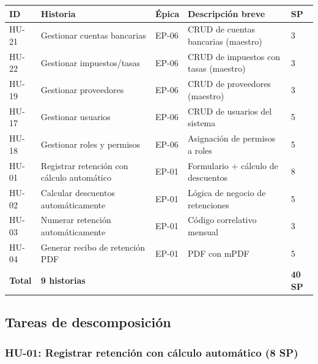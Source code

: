 \documentclass[stu]{apa7}
\begin{document}
\begin{longtable}{|C{1cm}|L{4cm}|L{2cm}|L{3cm}|L{2cm}|}
\hline
{}
\textbf{ID} & \textbf{Historia} & \textbf{Épica} & \textbf{Descripción breve} & \textbf{SP} \\
\hline
\endhead
HU-21 & Gestionar cuentas bancarias & EP-06 & CRUD de cuentas bancarias (maestro) & 3 \\
\hline
HU-22 & Gestionar impuestos/tasas & EP-06 & CRUD de impuestos con tasas (maestro) & 3 \\
\hline
HU-19 & Gestionar proveedores & EP-06 & CRUD de proveedores (maestro) & 3 \\
\hline
HU-17 & Gestionar usuarios & EP-06 & CRUD de usuarios del sistema & 5 \\
\hline
HU-18 & Gestionar roles y permisos & EP-06 & Asignación de permisos a roles & 5 \\
\hline
HU-01 & Registrar retención con cálculo automático & EP-01 & Formulario + cálculo de descuentos & 8 \\
\hline
HU-02 & Calcular descuentos automáticamente & EP-01 & Lógica de negocio de retenciones & 5 \\
\hline
HU-03 & Numerar retención automáticamente & EP-01 & Código correlativo mensual & 3 \\
\hline
HU-04 & Generar recibo de retención PDF & EP-01 & PDF con mPDF & 5 \\
\hline
{}
\textbf{Total} & \textbf{9 historias} & & & \textbf{40 SP} \\
\hline
\end{longtable}

\subsection{Tareas de descomposición}

\subsubsection{HU-01: Registrar retención con cálculo automático (8 SP)}
\end{document}
